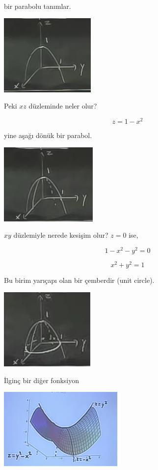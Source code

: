 \documentclass[12pt,fleqn]{article}\usepackage{../../common}
\begin{document}
bir parabolu tanımlar. 

\begin{center}
\includegraphics[height=4cm]{8_3.png}
\end{center}

Peki $xz$ düzleminde neler olur?

$$ z = 1- x^2 $$

yine aşağı dönük bir parabol. 

\begin{center}
\includegraphics[height=4cm]{8_4.png}
\end{center}

$xy$ düzlemiyle nerede kesişim olur? $z=0$ ise, 

$$ 1-x^2-y^2 = 0 $$

$$ x^2 + y^2 = 1 $$

Bu birim yarıçapı olan bir çemberdir (unit circle). 

\begin{center}
\includegraphics[height=4cm]{8_5.png}
\end{center}

İlginç bir diğer fonksiyon

\begin{center}
\includegraphics[height=4cm]{8_6.png}
\end{center}
\end{document}

